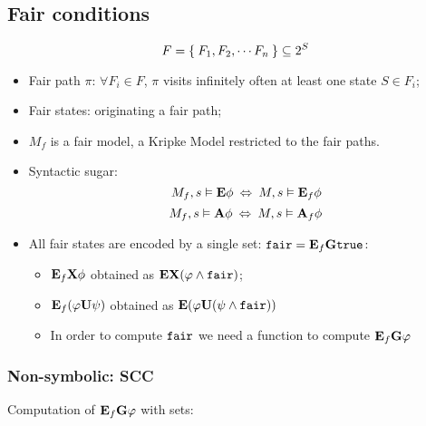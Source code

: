 \subsection{Fair conditions}

\[
    F = \Set{ F_1, F_2, \cdots F_n } \subseteq 2^S
\]

\begin{itemize}

\item   Fair path $\pi$: $\forall F_i \in F$, $\pi$ visits infinitely
        often at least one state $S \in F_i$;

\item   Fair states: originating a fair path;

\item   $M_f$ is a fair model, a Kripke Model restricted to the fair
        paths.

\item   Syntactic sugar:
        \[ M_f,s \vDash \mathcal{\mathcal{\sf \bf E}}{\phi}
           \:\Leftrightarrow\: M,s \vDash \mathcal{\mathcal{\sf \bf E}}_{f}{\phi} \]
        \[ M_f,s \vDash \mathcal{\mathcal{\sf \bf A}}{\phi}
           \:\Leftrightarrow\: M,s \vDash \mathcal{\mathcal{\sf \bf A}}_{f}{\phi} \]

\item   All fair states are encoded by a single set: $\mathcal{{\tt fair}} =
        \mathcal{\mathcal{\sf \bf E}}_{f}{\mathcal{\sf \bf G}\mathcal{{\tt true}}}$:
    \begin{itemize}
    \item   $\mathcal{\mathcal{\sf \bf E}}_{f}{\mathcal{\sf \bf X}\phi}$ obtained as $\mathcal{\mathcal{\sf \bf E}}{\mathcal{\sf \bf X}(\varphi \wedge \mathcal{{\tt fair}})}$;
    \item   $\mathcal{\mathcal{\sf \bf E}}_{f}{({\varphi}\mathcal{\sf \bf U}{\psi})}$ obtained as $\mathcal{\mathcal{\sf \bf E}}{({\varphi}\mathcal{\sf \bf U}{(\psi
            \wedge \mathcal{{\tt fair}})})}$
    \item   In order to compute $\mathcal{{\tt fair}}$ we need a function to compute
            $\mathcal{\mathcal{\sf \bf E}}_{f}{\mathcal{\sf \bf G}\varphi}$
    \end{itemize}

\end{itemize}

\subsubsection{Non-symbolic: SCC}

    Computation of $\mathcal{\mathcal{\sf \bf E}}_{f}{\mathcal{\sf \bf G}\varphi}$ with sets:

